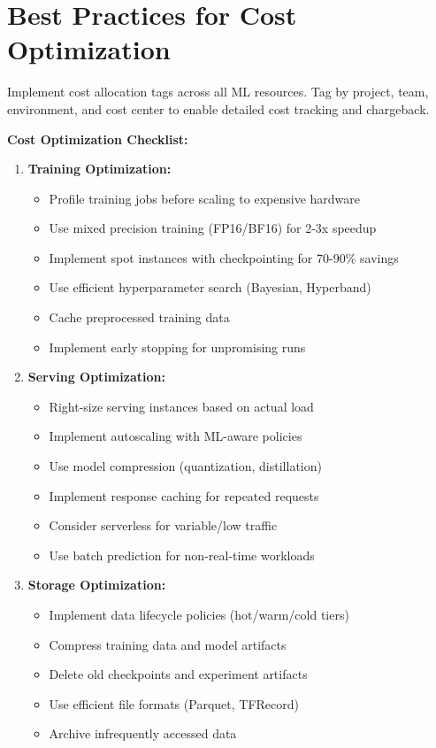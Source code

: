 \section{Best Practices for Cost Optimization}

\begin{bestpractice}
Implement cost allocation tags across all ML resources. Tag by project, team, environment, and cost center to enable detailed cost tracking and chargeback.
\end{bestpractice}

\textbf{Cost Optimization Checklist:}

\begin{enumerate}
    \item \textbf{Training Optimization:}
    \begin{itemize}
        \item Profile training jobs before scaling to expensive hardware
        \item Use mixed precision training (FP16/BF16) for 2-3x speedup
        \item Implement spot instances with checkpointing for 70-90\% savings
        \item Use efficient hyperparameter search (Bayesian, Hyperband)
        \item Cache preprocessed training data
        \item Implement early stopping for unpromising runs
    \end{itemize}

    \item \textbf{Serving Optimization:}
    \begin{itemize}
        \item Right-size serving instances based on actual load
        \item Implement autoscaling with ML-aware policies
        \item Use model compression (quantization, distillation)
        \item Implement response caching for repeated requests
        \item Consider serverless for variable/low traffic
        \item Use batch prediction for non-real-time workloads
    \end{itemize}

    \item \textbf{Storage Optimization:}
    \begin{itemize}
        \item Implement data lifecycle policies (hot/warm/cold tiers)
        \item Compress training data and model artifacts
        \item Delete old checkpoints and experiment artifacts
        \item Use efficient file formats (Parquet, TFRecord)
        \item Archive infrequently accessed data
    \end{itemize}


\end{enumerate}
